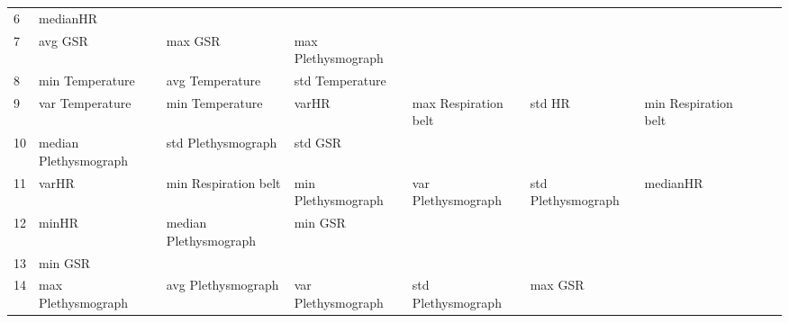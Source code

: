 \begin{landscape}
\begin{table}[]
\begin{tabular}{l|llllllll}
6        & medianHR                &                         &                         &                         &                         &                       &                         &                         &                         &         \\
7        & avg GSR                 & max GSR                 & max Plethysmograph      &                         &                         &                       &                         &                         &                         &         \\
8        & min Temperature         & avg Temperature         & std Temperature         &                         &                         &                       &                         &                         &                         &         \\
9        & var Temperature         & min Temperature         & varHR                   & max Respiration belt    & std HR                  & min Respiration belt  &                         &                         &                         &         \\
10       & median Plethysmograph   & std Plethysmograph      & std GSR                 &                         &                         &                       &                         &                         &                         &         \\
11       & varHR                   & min Respiration belt    & min Plethysmograph      & var Plethysmograph      & std Plethysmograph      & medianHR              &                         &                         &                         &         \\
12       & minHR                   & median Plethysmograph   & min GSR                 &                         &                         &                       &                         &                         &                         &         \\
13       & min GSR                 &                         &                         &                         &                         &                       &                         &                         &                         &         \\
14       & max Plethysmograph      & avg Plethysmograph      & var Plethysmograph      & std Plethysmograph      & max GSR                 &                       &                         &                         &                         &         \\

\end{tabular}
\end{table}
\end{landscape}

